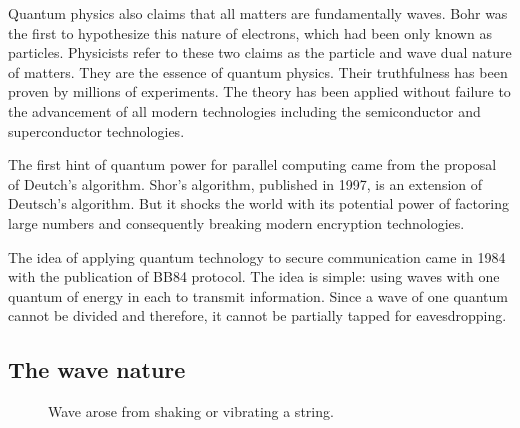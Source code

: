 \documentclass[oneside, letter, 12pt]{book}
\begin{document}
Quantum physics also claims that all matters are fundamentally waves. Bohr was the first to hypothesize this nature of electrons, which had been only known as particles. Physicists refer to these two claims as the particle and wave dual nature of matters. They are the essence of quantum physics. Their truthfulness has been proven by millions of experiments. The theory has been applied without failure to the advancement of all modern technologies including the semiconductor and superconductor technologies.

The first hint of quantum power for parallel computing came from the proposal of Deutch's algorithm\cite{1985Deutsch}. Shor's algorithm, published in 1997, is an extension of Deutsch's algorithm. But it shocks the world with its potential power of factoring large numbers and consequently breaking modern encryption technologies.

The idea of applying quantum technology to secure communication came in 1984 with the publication of BB84 protocol\cite{BB84}. The idea is simple: using waves with one quantum of energy in each to transmit information. Since a wave of one quantum cannot be divided and therefore, it cannot be partially tapped for eavesdropping.

\subsection{The wave nature}
\begin{figure}[ht]\label{String}
\caption{Wave arose from shaking or vibrating a string.}
\end{figure}
\end{document}
